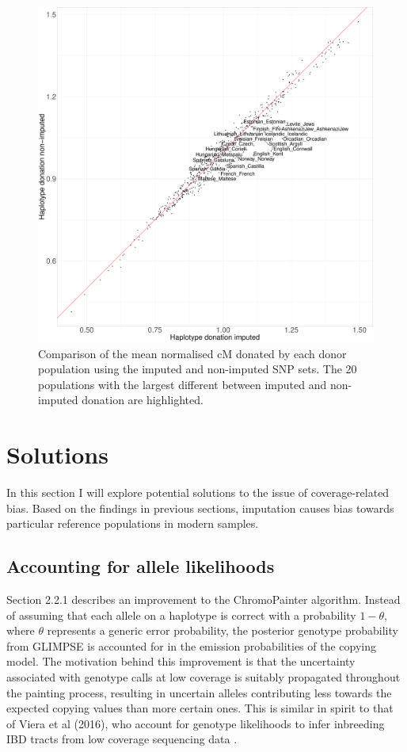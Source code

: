 \begin{figure}[htp]
    \centering
    \includegraphics[width=1.0\textwidth]{../images/chapter1/donation_imputed_nonimputed.pdf}
    \caption{Comparison of the mean normalised cM donated by each donor population using the imputed and non-imputed SNP sets. The 20 populations with the largest different between imputed and non-imputed donation are highlighted.}
    \label{fig:imputed_nonimputed_donation}
\end{figure}

\section{Solutions}

In this section I will explore potential solutions to the issue of coverage-related bias. Based on the findings in previous sections, imputation causes bias towards particular reference populations in modern samples.  

\subsection{Accounting for allele likelihoods}

Section 2.2.1 describes an improvement to the ChromoPainter algorithm. Instead of assuming that each allele on a haplotype is correct with a probability $1-\theta$, where $\theta$ represents a generic error probability, the posterior genotype probability from GLIMPSE is accounted for in the emission probabilities of the copying model. The motivation behind this improvement is that the uncertainty associated with genotype calls at low coverage is suitably propagated throughout the painting process, resulting in uncertain alleles contributing less towards the expected copying values than more certain ones. This is similar in spirit to that of Viera et al (2016), who account for genotype likelihoods to infer inbreeding IBD tracts from low coverage sequencing data \cite{vieira2016estimating}.

